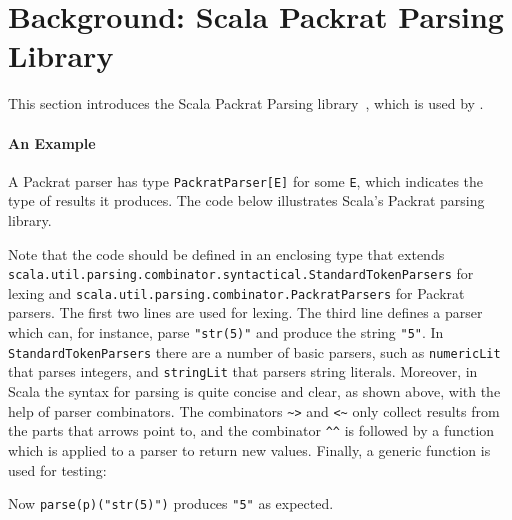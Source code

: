 \section{Background: Scala Packrat Parsing Library}\label{sec:packratparsers}


This section introduces the Scala Packrat Parsing library~\cite{}, which is
used by \name.

\paragraph{An Example}
A Packrat parser has type \lstinline{PackratParser[E]} for some
\lstinline{E}, which indicates the type of results it produces.
The code below illustrates
Scala's Packrat parsing library.

\noindent

Note that the code should be defined in an enclosing type that extends
\lstinline{scala.util.parsing.combinator.syntactical.StandardTokenParsers}
for lexing and
\lstinline{scala.util.parsing.combinator.PackratParsers} for Packrat
parsers.
The first two lines are used for lexing. The third line defines a
parser which can, for instance, parse \lstinline{"str(5)"} and produce
the string \lstinline{"5"}. In \lstinline{StandardTokenParsers} there
are a number of basic parsers, such as \lstinline{numericLit} that
parses integers, and \lstinline{stringLit} that parsers string
literals. Moreover, in Scala the syntax for parsing
is quite concise and clear, as shown above, with the help of
parser combinators. The combinators \lstinline{~>} and \lstinline{<~} only collect
results from the parts that arrows point to, and the combinator \lstinline{^^} is
followed by a function which is applied to a parser to return new
values. Finally, a generic 
function is used for testing:

Now \lstinline{parse(p)("str(5)")} produces \lstinline{"5"} as expected.

